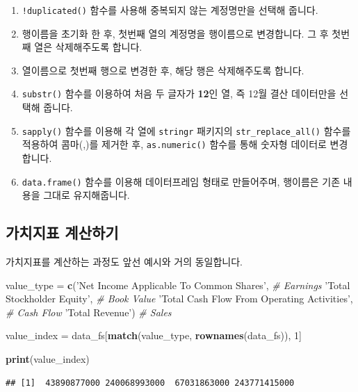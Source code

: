 \documentclass[12pt,]{book}
\newenvironment{Shaded}{\begin{snugshade}}{\end{snugshade}}
\newcommand{\CommentTok}[1]{\textcolor[rgb]{0.56,0.35,0.01}{\textit{#1}}}
\newcommand{\DecValTok}[1]{\textcolor[rgb]{0.00,0.00,0.81}{#1}}
\newcommand{\KeywordTok}[1]{\textcolor[rgb]{0.13,0.29,0.53}{\textbf{#1}}}
\newcommand{\NormalTok}[1]{#1}
\newcommand{\StringTok}[1]{\textcolor[rgb]{0.31,0.60,0.02}{#1}}
\providecommand{\tightlist}{%
  \setlength{\itemsep}{0pt}\setlength{\parskip}{0pt}}
\begin{document}
\begin{enumerate}
\def\labelenumi{\arabic{enumi}.}
\tightlist
\item
  \texttt{!duplicated()} 함수를 사용해 중복되지 않는 계정명만을 선택해 줍니다.
\item
  행이름을 초기화 한 후, 첫번째 열의 계정명을 행이름으로 변경합니다. 그 후 첫번째 열은 삭제해주도록 합니다.
\item
  열이름으로 첫번째 행으로 변경한 후, 해당 행은 삭제해주도록 합니다.
\item
  \texttt{substr()} 함수를 이용하여 처음 두 글자가 \textbf{12}인 열, 즉 12월 결산 데이터만을 선택해 줍니다.
\item
  \texttt{sapply()} 함수를 이용해 각 열에 \texttt{stringr} 패키지의 \texttt{str\_replace\_all()} 함수를 적용하여 콤마(,)를 제거한 후, \texttt{as.numeric()} 함수를 통해 숫자형 데이터로 변경합니다.
\item
  \texttt{data.frame()} 함수를 이용해 데이터프레임 형태로 만들어주며, 행이름은 기존 내용을 그대로 유지해줍니다.
\end{enumerate}

\hypertarget{section-33}{%
\subsection{가치지표 계산하기}\label{section-33}}

가치지표를 계산하는 과정도 앞선 예시와 거의 동일합니다.

\begin{Shaded}
\begin{Highlighting}[]
\NormalTok{value_type =}
\StringTok{  }\KeywordTok{c}\NormalTok{(}\StringTok{'Net Income Applicable To Common Shares'}\NormalTok{, }\CommentTok{# Earnings}
    \StringTok{'Total Stockholder Equity'}\NormalTok{, }\CommentTok{# Book Value}
    \StringTok{'Total Cash Flow From Operating Activities'}\NormalTok{, }\CommentTok{# Cash Flow}
    \StringTok{'Total Revenue'}\NormalTok{) }\CommentTok{# Sales}

\NormalTok{value_index =}\StringTok{ }\NormalTok{data_fs[}\KeywordTok{match}\NormalTok{(value_type, }\KeywordTok{rownames}\NormalTok{(data_fs)), }\DecValTok{1}\NormalTok{]}

\KeywordTok{print}\NormalTok{(value_index)}
\end{Highlighting}
\end{Shaded}

\begin{verbatim}
## [1]  43890877000 240068993000  67031863000 243771415000
\end{verbatim}
\end{document}
